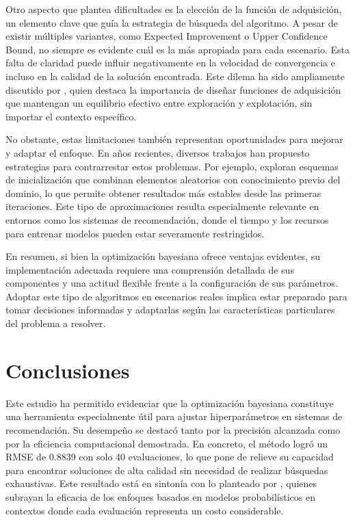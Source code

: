\documentclass[twocolumn,10pt]{article}
\begin{document}
Otro aspecto que plantea dificultades es la elección de la función de adquisición, un elemento clave que guía la estrategia de búsqueda del algoritmo. A pesar de existir múltiples variantes, como Expected Improvement o Upper Confidence Bound, no siempre es evidente cuál es la más apropiada para cada escenario. Esta falta de claridad puede influir negativamente en la velocidad de convergencia e incluso en la calidad de la solución encontrada. Este dilema ha sido ampliamente discutido por \citet{brochu2010tutorial}, quien destaca la importancia de diseñar funciones de adquisición que mantengan un equilibrio efectivo entre exploración y explotación, sin importar el contexto específico.

No obstante, estas limitaciones también representan oportunidades para mejorar y adaptar el enfoque. En años recientes, diversos trabajos han propuesto estrategias para contrarrestar estos problemas. Por ejemplo, \citet{wang2020new} exploran esquemas de inicialización que combinan elementos aleatorios con conocimiento previo del dominio, lo que permite obtener resultados más estables desde las primeras iteraciones. Este tipo de aproximaciones resulta especialmente relevante en entornos como los sistemas de recomendación, donde el tiempo y los recursos para entrenar modelos pueden estar severamente restringidos.

En resumen, si bien la optimización bayesiana ofrece ventajas evidentes, su implementación adecuada requiere una comprensión detallada de sus componentes y una actitud flexible frente a la configuración de sus parámetros. Adoptar este tipo de algoritmos en escenarios reales implica estar preparado para tomar decisiones informadas y adaptarlas según las características particulares del problema a resolver.

\section{Conclusiones}

Este estudio ha permitido evidenciar que la optimización bayesiana constituye una herramienta especialmente útil para ajustar hiperparámetros en sistemas de recomendación. Su desempeño se destacó tanto por la precisión alcanzada como por la eficiencia computacional demostrada. En concreto, el método logró un RMSE de 0.8839 con solo 40 evaluaciones, lo que pone de relieve su capacidad para encontrar soluciones de alta calidad sin necesidad de realizar búsquedas exhaustivas. Este resultado está en sintonía con lo planteado por \citet{snoek2012practical}, quienes subrayan la eficacia de los enfoques basados en modelos probabilísticos en contextos donde cada evaluación representa un costo considerable.
\end{document}
